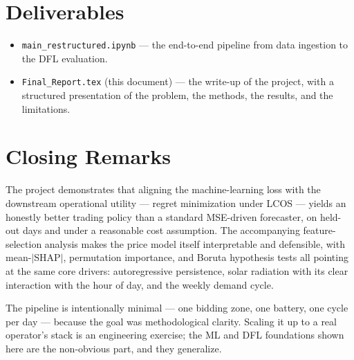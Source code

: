 \documentclass[11pt,a4paper]{article}
\newcommand{\code}[1]{\allowbreak\texttt{\small #1}\allowbreak}
\begin{document}
\section{Deliverables}

\begin{itemize}[leftmargin=1.5em]
  \item \code{main\_restructured.ipynb} --- the end-to-end pipeline
    from data ingestion to the DFL evaluation.
  \item \code{Final\_Report.tex} (this document) --- the write-up of the project, with a structured presentation of the
    problem, the methods, the results, and the limitations.
\end{itemize}


\section{Closing Remarks}

The project demonstrates that aligning the machine-learning loss with
the downstream operational utility --- regret minimization under LCOS
--- yields an honestly better trading policy than a standard MSE-driven
forecaster, on held-out days and under a reasonable cost assumption.
The accompanying feature-selection analysis makes the price model
itself interpretable and defensible, with mean-$|$SHAP$|$, permutation
importance, and Boruta hypothesis tests all pointing at the same core
drivers: autoregressive persistence, solar radiation with its clear
interaction with the hour of day, and the weekly demand cycle.

The pipeline is intentionally minimal --- one bidding zone, one
battery, one cycle per day --- because the goal was methodological
clarity. Scaling it up to a real operator's stack is an engineering
exercise; the ML and DFL foundations shown here are the non-obvious
part, and they generalize.
\end{document}
